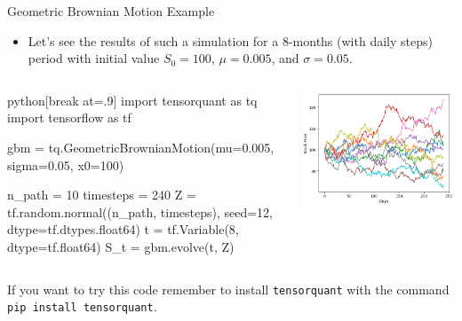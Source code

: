 \documentclass{beamer}
\begin{document}
\begin{frame}[fragile]{Geometric Brownian Motion Example}
\begin{itemize}
    \item Let's see the results of such a simulation for a 8-months (with daily steps) period with initial value $S_0=100$, $\mu=0.005$, and $\sigma=0.05$.
\end{itemize}

\begin{columns}
\begin{mintedbox}{python}[break at=.9\textheight]
import tensorquant as tq
import tensorflow as tf

gbm = tq.GeometricBrownianMotion(mu=0.005, sigma=0.05, x0=100)

n_path = 10
timesteps = 240
Z = tf.random.normal((n_path, timesteps), seed=12, dtype=tf.dtypes.float64)
t = tf.Variable(8, dtype=tf.float64)
S_t = gbm.evolve(t, Z)
\end{mintedbox}
    \includegraphics[width=1.1\linewidth]{images/gbm_realizations}
\end{columns}
If you want to try this code remember to install \texttt{tensorquant} with the command \texttt{pip install tensorquant}.
\end{frame}
\end{document}
